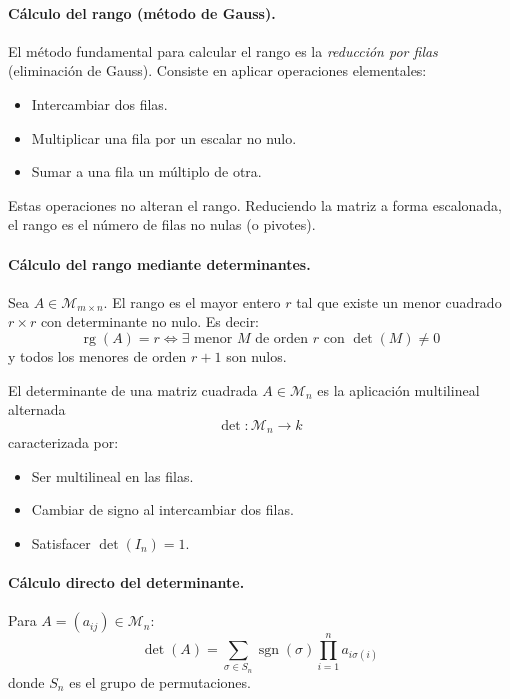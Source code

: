 \documentclass[10pt]{article}
\begin{document}
\paragraph{Cálculo del rango (método de Gauss).}

El método fundamental para calcular el rango es la \textit{reducción por filas} (eliminación de Gauss). Consiste en aplicar operaciones elementales:
\begin{itemize}
  \item Intercambiar dos filas.
  \item Multiplicar una fila por un escalar no nulo.
  \item Sumar a una fila un múltiplo de otra.
\end{itemize}

Estas operaciones no alteran el rango. Reduciendo la matriz a forma escalonada, el rango es el número de filas no nulas (o pivotes).

\paragraph{Cálculo del rango mediante determinantes.}

Sea $ A \in \mathcal{M}_{m \times n} $. El rango es el mayor entero $ r $ tal que existe un menor cuadrado $ r \times r $ con determinante no nulo. Es decir:
\[
\operatorname{rg}(A) = r \iff \exists \text{ menor } M \text{ de orden } r \text{ con } \det(M) \neq 0
\]
y todos los menores de orden $ r+1 $ son nulos.

\begin{definition}
  El determinante de una matriz cuadrada $ A \in \mathcal{M}_n $ es la aplicación multilineal alternada
  \[
  \det : \mathcal{M}_n \to k
  \]
  caracterizada por:
  \begin{itemize}
    \item Ser multilineal en las filas.
    \item Cambiar de signo al intercambiar dos filas.
    \item Satisfacer $\det(I_n)=1$.
  \end{itemize}
\end{definition}

\paragraph{Cálculo directo del determinante.}

Para $ A = (a_{ij}) \in \mathcal{M}_n $:
\[
\det(A) = \sum_{\sigma \in S_n} \operatorname{sgn}(\sigma)
\prod_{i=1}^n a_{i\sigma(i)}
\]
donde $ S_n $ es el grupo de permutaciones.
\end{document}

